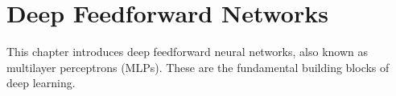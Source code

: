 
\chapter{Deep Feedforward Networks}
\label{chap:feedforward-networks}

This chapter introduces deep feedforward neural networks, also known as multilayer perceptrons (MLPs). These are the fundamental building blocks of deep learning.







